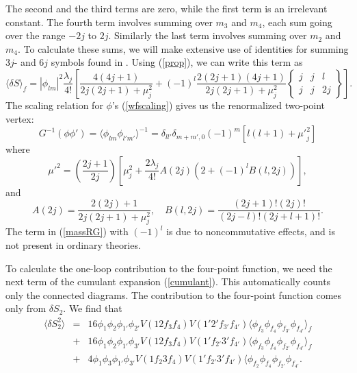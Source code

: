 \documentclass[a4paper,12pt]{article}
\numberwithin{equation}{section}
\begin{document}
The second and the third terms are zero, while the first term is an
irrelevant constant. The fourth term involves summing over $m_3$ and
$m_4$, each sum going over the range $-2j$ to $2j$. Similarly the last
term involves summing over $m_2$ and $m_4$. To calculate these sums,
we will make extensive use of identities for summing $3j$- and $6j$
symbols found in \cite{vmkBook}. Using (\ref{prop}), we can write this
term as
\begin{equation} 
\langle \delta S \rangle_f = |\phi_{lm}|^2 \frac{\lambda_j}{4!}
\left[\frac{4(4j+1)}{2j(2j+1) + \mu_j^2} + (-1)^l
\frac{2(2j+1)(4j+1)}{2j(2j+1)+\mu_j^2} \left\{ \begin{array}{ccc}
				                 j & j & l \\
				                 j & j & 2j
			                      \end{array} \right\}
\right].
\end{equation} 
The scaling relation for $\phi$'s (\ref{wfscaling}) gives us the
renormalized two-point vertex:
\begin{equation}
G^{-1}(\phi \phi') = \langle \phi_{lm} \phi_{l' m'} \rangle^{-1} =
\delta_{l l'} \delta_{m + m',0} (-1)^m [l(l+1) + {\mu'}^2_j] 
\end{equation} 
where
\begin{equation} 
{\mu'}^2 = \left(\frac{2j+1}{2j}\right)\left[\mu_j^2 + \frac{2 \lambda_j}{4!}
A(2j) (2+ (-1)^l B(l,2j)) \right],
\label{massRG}
\end{equation} 
and
\begin{equation} 
A(2j) = \frac{2(2j)+1}{2j(2j+1)+\mu_j^2}, \quad B(l,2j)= \frac{(2j+1)!
(2j)!}{(2j-l)! (2j+l+1)!}.
\label{defAB}
\end{equation}
The term in (\ref{massRG}) with $(-1)^l$ is due to noncommutative
effects, and is not present in ordinary theories. 

To calculate the one-loop contribution to the four-point function, we
need the next term of the cumulant expansion (\ref{cumulant}). This
automatically counts only the connected diagrams. The contribution
to the four-point function comes only from $\delta S_2$. We find that 
\begin{eqnarray}       	  
\langle \delta S_2^2 \rangle &=& 16 \phi_1 \phi_2 \phi_{1'} \phi_{2'}
V(12f_3 f_4)  V(1' 2' f_{3'} f_{4'}) \langle \phi_{f_3} \phi_{f_4}
\phi_{f_{3'}} \phi_{f_{4'}} \rangle_f \nonumber \\ 
&+& 16 \phi_1 \phi_2 \phi_{1'} \phi_{3'} V(12 f_3 f_4)V(1' f_{2'} 3'
f_{4'}) \langle \phi_{f_3} \phi_{f_4}\phi_{f_{2'}} \phi_{f_{4'}}
\rangle_f \nonumber \\ 
&+& 4 \phi_1 \phi_3 \phi_{1'} \phi_{3'} V(1 f_2 3 f_4) V(1' f_{2'} 3'
f_{4'})\langle \phi_{f_2} \phi_{f_4} \phi_{f_{2'}} \phi_{f_{4'}}.  
\end{eqnarray} 
\end{document}
